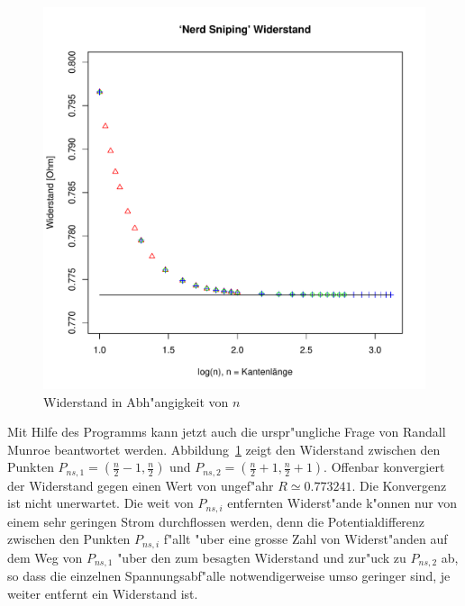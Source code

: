 \begin{figure}
\begin{center}
\includegraphics[width=\hsize]{graphics/snipingresistance}
\end{center}
\caption{Widerstand in Abh"angigkeit von $n$\label{snipingresistance}}
\end{figure}
Mit Hilfe des Programms kann jetzt auch die urspr"ungliche Frage von
Randall Munroe beantwortet werden. Abbildung~\ref{snipingresistance} zeigt
den Widerstand zwischen den Punkten $P_{ns,1}=(\frac{n}2-1,\frac{n}2)$ und
$P_{ns,2}=(\frac{n}2+1,\frac{n}2+1)$. Offenbar konvergiert der Widerstand
gegen einen Wert von ungef"ahr $R\simeq 0.773241$.  Die Konvergenz
ist nicht unerwartet.  Die weit von $P_{ns,i}$ entfernten Widerst"ande
k"onnen nur von einem sehr geringen Strom durchflossen werden, denn die
Potentialdifferenz zwischen den Punkten $P_{ns,i}$ f"allt "uber eine
grosse Zahl von Widerst"anden auf dem Weg von $P_{ns,1}$ "uber den zum
besagten Widerstand und zur"uck zu $P_{ns,2}$ ab, so dass die einzelnen
Spannungsabf"alle notwendigerweise umso geringer sind, je weiter entfernt
ein Widerstand ist.



